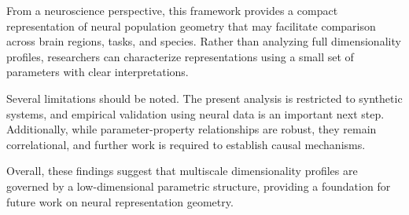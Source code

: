 \documentclass[11pt]{article}
\begin{document}
From a neuroscience perspective, this framework provides a compact representation of neural population geometry that may facilitate comparison across brain regions, tasks, and species. Rather than analyzing full dimensionality profiles, researchers can characterize representations using a small set of parameters with clear interpretations.

Several limitations should be noted. The present analysis is restricted to synthetic systems, and empirical validation using neural data is an important next step. Additionally, while parameter-property relationships are robust, they remain correlational, and further work is required to establish causal mechanisms.

Overall, these findings suggest that multiscale dimensionality profiles are governed by a low-dimensional parametric structure, providing a foundation for future work on neural representation geometry.



\end{document}
